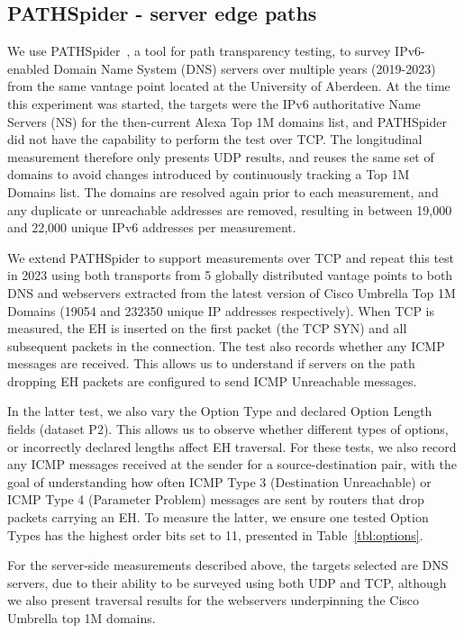 \documentclass[conference]{IEEEtran}
\begin{document}
    \subsection{PATHSpider - server edge paths}
    \label{sec:pathspider-methodology}

We use PATHSpider~\cite{learmonth2016pathspider}, a tool for path transparency testing, to survey IPv6-enabled Domain Name System (DNS) servers over multiple years (2019-2023) from the same vantage point located at the University of Aberdeen. At the time this experiment was started, the targets were the IPv6 authoritative Name Servers (NS) for the then-current Alexa Top 1M domains list, and PATHSpider did not have the capability to perform the test over TCP. The longitudinal measurement therefore only presents UDP results, and reuses the same set of domains to avoid changes introduced by continuously tracking a Top 1M Domains list. The domains are resolved again prior to each measurement, and any duplicate or unreachable addresses are removed, resulting in between 19,000 and 22,000 unique IPv6 addresses per measurement.

We extend PATHSpider to support measurements over TCP and repeat this test in 2023 using both transports from 5 globally distributed vantage points to both DNS and webservers extracted from the latest version of Cisco Umbrella Top 1M Domains (19054 and 232350 unique IP addresses respectively). When TCP is measured, the EH is inserted on the first packet (the TCP SYN) and all subsequent packets in the connection.
The test also records whether any ICMP messages are received. This allows us to understand if servers on the path dropping EH packets are configured to send ICMP Unreachable messages.

In the latter test, we also vary the Option Type and declared Option Length fields (dataset P2). This allows us to observe whether different types of options, or incorrectly declared lengths affect EH traversal. For these tests, we also record any ICMP messages received at the sender for a source-destination pair, with the goal of understanding how often ICMP Type 3 (Destination Unreachable) or ICMP Type 4 (Parameter Problem) messages are sent by routers that drop packets carrying an EH. To measure the latter, we ensure one tested Option Types has the highest order bits set to 11, presented in Table~\ref{tbl:options}.

For the server-side measurements described above, the targets selected are DNS servers, due to their ability to be surveyed using both UDP and TCP, although we also present traversal results for the webservers underpinning the Cisco Umbrella top 1M domains.
\end{document}
